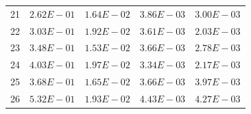 \documentclass[10pt,journal,compsoc]{IEEEtran}
\begin{document}
\begin{table}[h]
\begin{scriptsize}
{\begin{tabular}{|*{5}{c|}}
21&$2.62E-01$&$1.64E-02$&$3.86E-03$&\cellcolor{gray95}$3.00E-03$\\
22&$3.03E-01$&$1.92E-02$&$3.61E-03$&\cellcolor{gray95}$2.03E-03$\\
23&$3.48E-01$&$1.53E-02$&$3.66E-03$&\cellcolor{gray95}$2.78E-03$\\
24&$4.03E-01$&$1.97E-02$&$3.34E-03$&\cellcolor{gray95}$2.17E-03$\\
25&$3.68E-01$&$1.65E-02$&\cellcolor{gray95}$3.66E-03$&$3.97E-03$\\
26&$5.32E-01$&$1.93E-02$&$4.43E-03$&\cellcolor{gray95}$4.27E-03$\\\hline
\end{tabular}}
\end{scriptsize}
\end{table}
\end{document}
